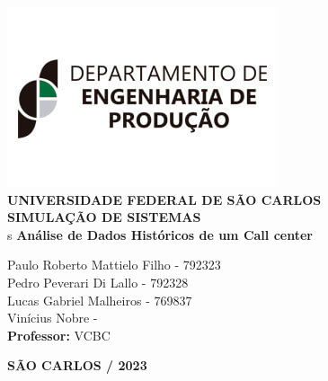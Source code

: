 \justifying %
\onehalfspacing %
\setlength{\parindent}{0cm}  %
\renewcommand*\familydefault{\rmdefault}
\thispagestyle{empty}
\begin{center}
\includegraphics[scale=0.6]{capa/logo-dep.jpg}\\
\vspace*{.8cm}
{\huge \textbf{UNIVERSIDADE FEDERAL DE SÃO CARLOS}}\\
\vspace*{.8cm}
{\Large \textbf{SIMULAÇÃO DE SISTEMAS}}\\s
\vspace*{3cm}
{\Large \textbf{Análise de Dados Históricos de um Call center}}\\
\vspace*{4.5cm}
\begin{flushright}
    \onehalfspacing
    {\Large  Paulo Roberto Mattielo Filho - 792323}\\
    {\Large  Pedro Peverari Di Lallo - 792328}\\
    {\Large  Lucas Gabriel Malheiros - 769837}\\
    {\Large  Vinícius Nobre - }\\
    \vspace*{.3cm}
    {\Large \textbf{Professor:}}
    {\Large VCBC}\\
\end{flushright}
\vspace*{\fill}
{\large \bf SÃO CARLOS / 2023}
\end{center}

